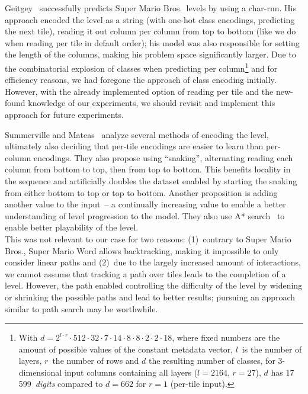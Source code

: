Geitgey~\cite{geitgeyMachineLearningFun2018} successfully predicts
Super Mario Bros.\ levels by using a char-rnn. His approach encoded
the level as a string (with one-hot class encodings, predicting the
next tile), reading it out column per column from top to bottom (like
we do when reading per tile in default order); his model was also
responsible for setting the length of the columns, making his problem
space significantly larger. Due to the combinatorial explosion of
classes when predicting per column\footnote{With
  $d = 2^{l \cdot r} \cdot 512 \cdot 32 \cdot 7 \cdot 14 \cdot 8 \cdot 8 \cdot 2 \cdot 2 \cdot 18$, where
  fixed numbers are the amount of possible values of the constant
  metadata vector, $l$~is the number of layers, $r$~the number of rows
  and $d$ the resulting number of classes, for 3-dimensional input
  columns containing all layers ($l = 2164$, $r = 27$), $d$ has
  17\,599~\emph{digits} compared to $d = 662$ for $r = 1$ (per-tile
  input).} and for efficiency reasons, we had foregone the approach of
class encoding initially. However, with the already implemented option
of reading per tile and the new-found knowledge of our experiments, we
should revisit and implement this approach for future experiments.

Summerville and Mateas~\cite{summervilleSuperMarioString2016} analyze
several methods of encoding the level, ultimately also deciding that
per-tile encodings are easier to learn than per-column encodings. They
also propose using ``snaking'', alternating reading each column from
bottom to top, then from top to bottom. This benefits locality in the
sequence and artificially doubles the dataset enabled by starting the
snaking from either bottom to top or top to bottom. Another
proposition is adding another value to the input~-- a continually
increasing value to enable a better understanding of level progression
to the model. They also use A* search~\cite{SearchAlgorithm2019}
to enable better playability of the level. \\
This was not relevant to our case for two reasons: (1)~contrary to
Super Mario Bros., Super Mario Word allows backtracking, making it
impossible to only consider linear paths and (2)~due to the largely
increased amount of interactions, we cannot assume that tracking a
path over tiles leads to the completion of a level. However, the path
enabled controlling the difficulty of the level by widening or
shrinking the possible paths and lead to better results; pursuing an
approach similar to path search may be worthwhile.
\medskip

